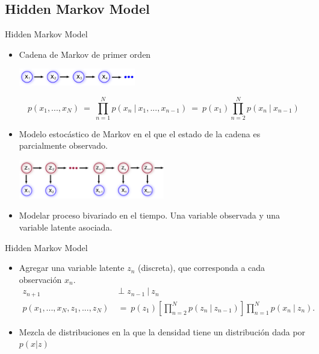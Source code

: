 \documentclass[10pt]{beamer}
\begin{document}
\subsection{Hidden Markov Model}
\begin{frame}{Hidden Markov Model}
  	\begin{itemize}
   	  \item Cadena de Markov de primer orden
   	  	\begin{center}
	        \includegraphics[width=0.4\textwidth]{gfx/mod-mm1}
        \end{center}
        
        \begin{equation}
          \label{eqn:1}
          p(x_1, ..., x_N) 
            ~=~ \prod_{n=1}^N p(x_n ~|~ x_1, ..., x_{n-1}) 
            ~=~ p(x_1) \prod_{n=2}^N p(x_n ~|~ x_{n-1}) 
        \end{equation} 
		  \item Modelo estocástico de Markov en el que el estado de la cadena es parcialmente observado.
		  	\begin{center}
	        \includegraphics[width=0.5\textwidth]{gfx/mod-hmm}
        \end{center}
		  \item Modelar proceso bivariado en el tiempo. Una variable observada y una variable latente asociada.
	\end{itemize}	
\end{frame}

\begin{frame}{Hidden Markov Model}
  \begin{itemize}
    \item Agregar una variable latente $z_n$ (discreta), que corresponda a cada observación $x_n$.
      \begin{align}
        z_{n+1} &\perp z_{n-1} ~|~ z_{n} \\
        p(x_1, ..., x_N, z_1, ..., z_N) &~=~ p(z_1) \left [ \prod_{n=2}^N p(z_n ~|~ z_{n-1}) \right ] 
          \prod_{n=1}^N p(x_n ~|~ z_{n}).
      \end{align}
      
    \item Mezcla de distribuciones en la que la densidad tiene un distribución dada por $p(x | z)$      
  \end{itemize}
\end{frame}
\end{document}
